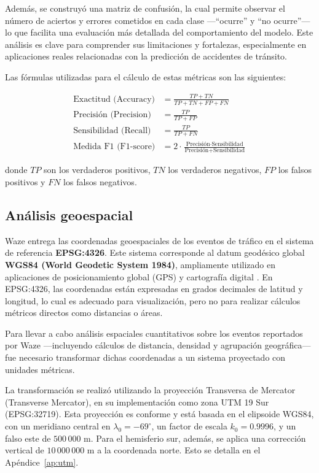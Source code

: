 \documentclass[12pt]{article}
\begin{document}
Además, se construyó una matriz de confusión, la cual permite observar el número de aciertos y errores cometidos en cada clase —“ocurre” y “no ocurre”— lo que facilita una evaluación más detallada del comportamiento del modelo. Este análisis es clave para comprender sus limitaciones y fortalezas, especialmente en aplicaciones reales relacionadas con la predicción de accidentes de tránsito.

Las fórmulas utilizadas para el cálculo de estas métricas son las siguientes:

\[
\begin{aligned}
\text{Exactitud (Accuracy)} &= \frac{TP + TN}{TP + TN + FP + FN} \\
\text{Precisión (Precision)} &= \frac{TP}{TP + FP} \\
\text{Sensibilidad (Recall)} &= \frac{TP}{TP + FN} \\
\text{Medida F1 (F1-score)} &= 2 \cdot \frac{\text{Precisión} \cdot \text{Sensibilidad}}{\text{Precisión} + \text{Sensibilidad}}
\end{aligned}
\]

donde \( TP \) son los verdaderos positivos, \( TN \) los verdaderos negativos, \( FP \) los falsos positivos y \( FN \) los falsos negativos.


\subsection{Análisis geoespacial}

Waze entrega las coordenadas geoespaciales de los eventos de tráfico en el sistema de referencia \textbf{EPSG:4326}. Este sistema corresponde al datum geodésico global \textbf{WGS84 (World Geodetic System 1984)}, ampliamente utilizado en aplicaciones de posicionamiento global (GPS) y cartografía digital \citep{epsg4326, wgs84_nima}. En EPSG:4326, las coordenadas están expresadas en grados decimales de latitud y longitud, lo cual es adecuado para visualización, pero no para realizar cálculos métricos directos como distancias o áreas.

Para llevar a cabo análisis espaciales cuantitativos sobre los eventos reportados por Waze —incluyendo cálculos de distancia, densidad y agrupación geográfica— fue necesario transformar dichas coordenadas a un sistema proyectado con unidades métricas.

La transformación se realizó utilizando la proyección Transversa de Mercator (Transverse Mercator), en su implementación como zona UTM 19 Sur (EPSG:32719). Esta proyección es conforme y está basada en el elipsoide WGS84, con un meridiano central en $\lambda_0 = -69^\circ$, un factor de escala $k_0 = 0.9996$, y un falso este de $500\,000$ m. Para el hemisferio sur, además, se aplica una corrección vertical de $10\,000\,000$ m a la coordenada norte. Esto se detalla en el Apéndice~\ref{ap:utm}.
\end{document}
